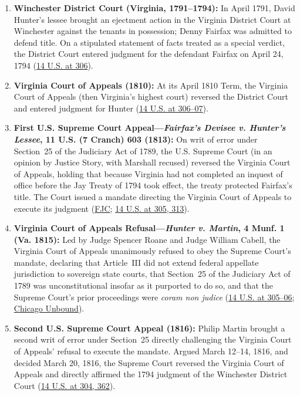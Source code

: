 \documentclass[12pt]{article}
\begin{document}
\begin{enumerate}
    \item \textbf{Winchester District Court (Virginia, 1791--1794):} In April 1791, David Hunter's lessee brought an ejectment action in the Virginia District Court at Winchester against the tenants in possession; Denny Fairfax was admitted to defend title. On a stipulated statement of facts treated as a special verdict, the District Court entered judgment for the defendant Fairfax on April 24, 1794 (\href{https://supreme.justia.com/cases/federal/us/14/304/}{14 U.S. at 306}).
    \item \textbf{Virginia Court of Appeals (1810):} At its April 1810 Term, the Virginia Court of Appeals (then Virginia's highest court) reversed the District Court and entered judgment for Hunter (\href{https://supreme.justia.com/cases/federal/us/14/304/}{14 U.S. at 306--07}).
    \item \textbf{First U.S. Supreme Court Appeal---\textit{Fairfax's Devisee v. Hunter's Lessee}, 11 U.S. (7 Cranch) 603 (1813):} On writ of error under Section~25 of the Judiciary Act of 1789, the U.S. Supreme Court (in an opinion by Justice Story, with Marshall recused) reversed the Virginia Court of Appeals, holding that because Virginia had not completed an inquest of office before the Jay Treaty of 1794 took effect, the treaty protected Fairfax's title. The Court issued a mandate directing the Virginia Court of Appeals to execute its judgment (\href{https://www.fjc.gov/history/cases/cases-that-shaped-the-federal-courts/martin-v-hunter-s-lessee}{FJC}; \href{https://supreme.justia.com/cases/federal/us/14/304/}{14 U.S. at 305, 313}).
    \item \textbf{Virginia Court of Appeals Refusal---\textit{Hunter v. Martin}, 4 Munf. 1 (Va. 1815):} Led by Judge Spencer Roane and Judge William Cabell, the Virginia Court of Appeals unanimously refused to obey the Supreme Court's mandate, declaring that Article~III did not extend federal appellate jurisdiction to sovereign state courts, that Section~25 of the Judiciary Act of 1789 was unconstitutional insofar as it purported to do so, and that the Supreme Court's prior proceedings were \textit{coram non judice} (\href{https://supreme.justia.com/cases/federal/us/14/304/}{14 U.S. at 305--06}; \href{https://chicagounbound.uchicago.edu/cgi/viewcontent.cgi?article=1427&context=journal_articles}{Chicago Unbound}).
    \item \textbf{Second U.S. Supreme Court Appeal (1816):} Philip Martin brought a second writ of error under Section~25 directly challenging the Virginia Court of Appeals' refusal to execute the mandate. Argued March 12--14, 1816, and decided March 20, 1816, the Supreme Court reversed the Virginia Court of Appeals and directly affirmed the 1794 judgment of the Winchester District Court (\href{https://supreme.justia.com/cases/federal/us/14/304/}{14 U.S. at 304, 362}).
\end{enumerate}
\end{document}
